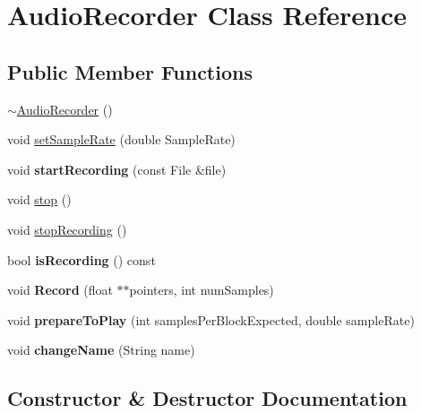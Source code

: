\hypertarget{class_audio_recorder}{}\section{Audio\+Recorder Class Reference}
\label{class_audio_recorder}
\subsection*{Public Member Functions}
\begin{DoxyCompactItemize}
\item 
\mbox{\hyperlink{class_audio_recorder_ad5a2d69da1c068d8aab68365e5b9208a}{$\sim$\+Audio\+Recorder}} ()
\item 
void \mbox{\hyperlink{class_audio_recorder_aa01c1566932438251cb5d6e5bb26dd47}{set\+Sample\+Rate}} (double Sample\+Rate)
\item 
\mbox{\label{class_audio_recorder_a3d361628161e57b86f7523f4b857bb89}} 
void {\bfseries start\+Recording} (const File \&file)
\item 
void \mbox{\hyperlink{class_audio_recorder_a07c47c753c1949479c3761bd7c5fe2c2}{stop}} ()
\item 
void \mbox{\hyperlink{class_audio_recorder_a51832d8932daa76e8b742606106f5872}{stop\+Recording}} ()
\item 
\mbox{\label{class_audio_recorder_a500dcd627ad37c80fd3584903e7ad262}} 
bool {\bfseries is\+Recording} () const
\item 
\mbox{\label{class_audio_recorder_aff55e246cf8699d2383b25e32b375611}} 
void {\bfseries Record} (float $\ast$$\ast$pointers, int num\+Samples)
\item 
\mbox{\label{class_audio_recorder_ab4fe975bd89087b3705346480c611442}} 
void {\bfseries prepare\+To\+Play} (int samples\+Per\+Block\+Expected, double sample\+Rate)
\item 
\mbox{\label{class_audio_recorder_a3784b8d16f871c456dde027c7661b633}} 
void {\bfseries change\+Name} (String name)
\end{DoxyCompactItemize}


\subsection{Constructor \& Destructor Documentation}
\mbox{\label{class_audio_recorder_ad5a2d69da1c068d8aab68365e5b9208a}} 
